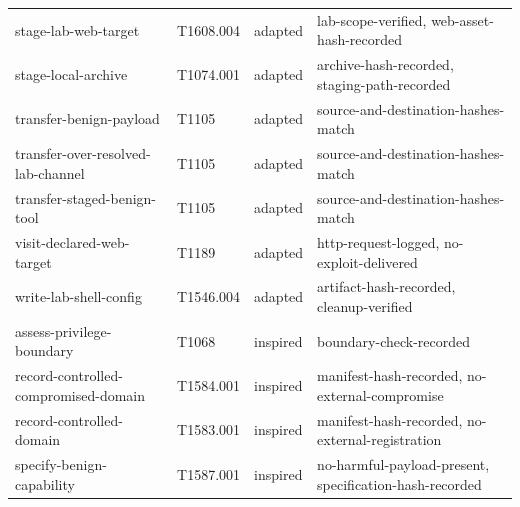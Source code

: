 \begin{tabularx}{\textwidth}{@{}>{\raggedright\arraybackslash}p{}>{\centering\arraybackslash}p{}>{\centering\arraybackslash}p{}L@{}}
stage-lab-web-target & T1608.004 & adapted & lab-scope-verified, web-asset-hash-recorded \\
stage-local-archive & T1074.001 & adapted & archive-hash-recorded, staging-path-recorded \\
transfer-benign-payload & T1105 & adapted & source-and-destination-hashes-match \\
transfer-over-resolved-lab-channel & T1105 & adapted & source-and-destination-hashes-match \\
transfer-staged-benign-tool & T1105 & adapted & source-and-destination-hashes-match \\
visit-declared-web-target & T1189 & adapted & http-request-logged, no-exploit-delivered \\
write-lab-shell-config & T1546.004 & adapted & artifact-hash-recorded, cleanup-verified \\
assess-privilege-boundary & T1068 & inspired & boundary-check-recorded \\
record-controlled-compromised-domain & T1584.001 & inspired & manifest-hash-recorded, no-external-compromise \\
record-controlled-domain & T1583.001 & inspired & manifest-hash-recorded, no-external-registration \\
specify-benign-capability & T1587.001 & inspired & no-harmful-payload-present, specification-hash-recorded \\
\bottomrule
\end{tabularx}
